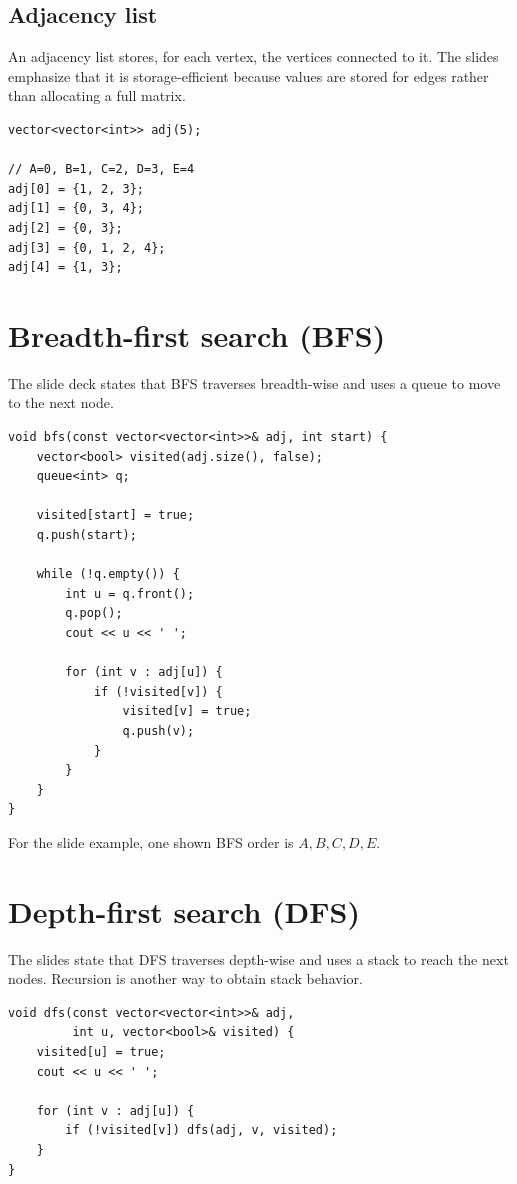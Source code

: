 \subsection{Adjacency list}

An adjacency list stores, for each vertex, the vertices connected to it. The slides emphasize that it is storage-efficient because values are stored for edges rather than allocating a full matrix.

\begin{lstlisting}
vector<vector<int>> adj(5);

// A=0, B=1, C=2, D=3, E=4
adj[0] = {1, 2, 3};
adj[1] = {0, 3, 4};
adj[2] = {0, 3};
adj[3] = {0, 1, 2, 4};
adj[4] = {1, 3};
\end{lstlisting}

\section{Breadth-first search (BFS)}

The slide deck states that BFS traverses breadth-wise and uses a queue to move to the next node.

\begin{lstlisting}
void bfs(const vector<vector<int>>& adj, int start) {
    vector<bool> visited(adj.size(), false);
    queue<int> q;

    visited[start] = true;
    q.push(start);

    while (!q.empty()) {
        int u = q.front();
        q.pop();
        cout << u << ' ';

        for (int v : adj[u]) {
            if (!visited[v]) {
                visited[v] = true;
                q.push(v);
            }
        }
    }
}
\end{lstlisting}

For the slide example, one shown BFS order is $A,B,C,D,E$.

\section{Depth-first search (DFS)}

The slides state that DFS traverses depth-wise and uses a stack to reach the next nodes. Recursion is another way to obtain stack behavior.

\begin{lstlisting}
void dfs(const vector<vector<int>>& adj,
         int u, vector<bool>& visited) {
    visited[u] = true;
    cout << u << ' ';

    for (int v : adj[u]) {
        if (!visited[v]) dfs(adj, v, visited);
    }
}
\end{lstlisting}

